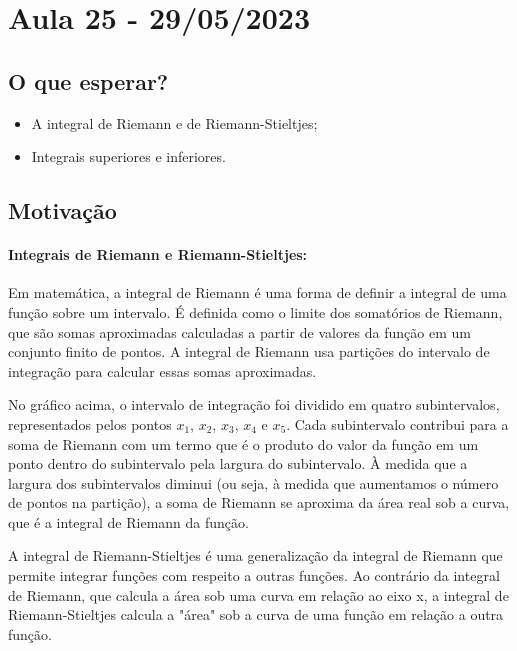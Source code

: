 \documentclass[Analysis/analysis_notes.tex]{subfiles}
\begin{document}
\section{Aula 25 - 29/05/2023}
\subsection{O que esperar?}
\begin{itemize}
  \item A integral de Riemann e de Riemann-Stieltjes;
  \item Integrais superiores e inferiores.
\end{itemize}
\subsection{Motiva\c cão}
 \paragraph{Integrais de Riemann e Riemann-Stieltjes:}
Em matemática, a integral de Riemann é uma forma de definir a integral de uma
função sobre um intervalo. É definida como o limite dos somatórios de Riemann,
que são somas aproximadas calculadas a partir de valores da função em um
conjunto finito de pontos. A integral de Riemann usa partições do intervalo 
de integração para calcular essas somas aproximadas. 


No gráfico acima, o intervalo de integração foi dividido em quatro subintervalos,
representados pelos pontos $x_1$, $x_2$, $x_3$, $x_4$ e $x_5$.
Cada subintervalo contribui para a soma de Riemann com um termo que é o
produto do valor da função em um ponto dentro do subintervalo pela largura do
subintervalo. À medida que a largura dos subintervalos diminui (ou seja, à
medida que aumentamos o número de pontos na partição), a soma de Riemann se
aproxima da área real sob a curva, que é a integral de Riemann da função.

A integral de Riemann-Stieltjes é uma generalização da integral de Riemann
que permite integrar funções com respeito a outras funções. Ao contrário da
integral de Riemann, que calcula a área sob uma curva em relação ao eixo x,
a integral de Riemann-Stieltjes calcula a "área" sob a curva de uma função em
relação a outra função.
\end{document}
